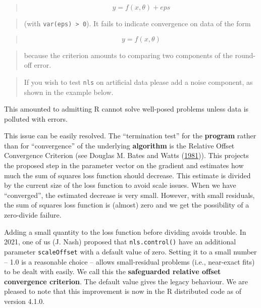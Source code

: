 \documentclass[
]{article}
\begin{document}
\begin{quote}
\[  y = f(x, \theta) + eps \]
\end{quote}

\begin{quote}
(with \texttt{var(eps)\ \textgreater{}\ 0}). It fails to indicate
convergence on data of the form
\end{quote}

\begin{quote}
\[  y = f(x, \theta)  \]
\end{quote}

\begin{quote}
because the criterion amounts to comparing two components of the
round-off error.
\end{quote}

\begin{quote}
If you wish to test \texttt{nls} on artificial data please add a noise
component, as shown in the example below.
\end{quote}

This amounted to admitting R cannot solve well-posed problems unless
data is polluted with errors.

This issue can be easily resolved. The ``termination test'' for the
\textbf{program} rather than for ``convergence'' of the underlying
\textbf{algorithm} is the Relative Offset Convergence Criterion (see
Douglas M. Bates and Watts
(\protect\hyperlink{ref-BatesWatts81}{1981})). This projects the
proposed step in the parameter vector on the gradient and estimates how
much the sum of squares loss function should decrease. This estimate is
divided by the current size of the loss function to avoid scale issues.
When we have ``converged'', the estimated decrease is very small.
However, with small residuals, the sum of squares loss function is
(almost) zero and we get the possibility of a zero-divide failure.

Adding a small quantity to the loss function before dividing avoids
trouble. In 2021, one of us (J. Nash) proposed that
\texttt{nls.control()} have an additional parameter \texttt{scaleOffset}
with a default value of zero. Setting it to a small number -- 1.0 is a
reasonable choice -- allows small-residual problems (i.e., near-exact
fits) to be dealt with easily. We call this the \textbf{safeguarded
relative offset convergence criterion}. The default value gives the
legacy behaviour. We are pleased to note that this improvement is now in
the R distributed code as of version 4.1.0.
\end{document}
